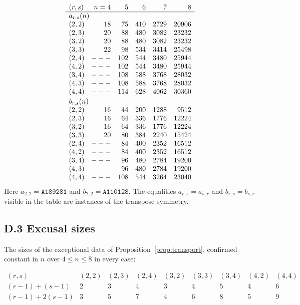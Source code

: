 \documentclass[11pt]{article}
\theoremstyle{definition}
\begin{document}
\[
\begin{array}{lrrrrr}
(r,s) & n=4 & 5 & 6 & 7 & 8\\\hline
\multicolumn{6}{l}{a_{r,s}(n)}\\
(2,2) & 18 & 75 & 410 & 2729 & 20906\\
(2,3) & 20 & 88 & 480 & 3082 & 23232\\
(3,2) & 20 & 88 & 480 & 3082 & 23232\\
(3,3) & 22 & 98 & 534 & 3414 & 25498\\
(2,4) & --- & 102 & 544 & 3480 & 25944\\
(4,2) & --- & 102 & 544 & 3480 & 25944\\
(3,4) & --- & 108 & 588 & 3768 & 28032\\
(4,3) & --- & 108 & 588 & 3768 & 28032\\
(4,4) & --- & 114 & 628 & 4062 & 30360\\[2pt]
\multicolumn{6}{l}{b_{r,s}(n)}\\
(2,2) & 16 & 44 & 200 & 1288 & 9512\\
(2,3) & 16 & 64 & 336 & 1776 & 12224\\
(3,2) & 16 & 64 & 336 & 1776 & 12224\\
(3,3) & 20 & 80 & 384 & 2240 & 15424\\
(2,4) & --- & 84 & 400 & 2352 & 16512\\
(4,2) & --- & 84 & 400 & 2352 & 16512\\
(3,4) & --- & 96 & 480 & 2784 & 19200\\
(4,3) & --- & 96 & 480 & 2784 & 19200\\
(4,4) & --- & 108 & 544 & 3264 & 23040
\end{array}
\]
Here $a_{2,2}=\texttt{A189281}$ and $b_{2,2}=\texttt{A110128}$. The equalities
$a_{r,s}=a_{s,r}$ and $b_{r,s}=b_{s,r}$ visible in the table are instances of
the transpose symmetry.

\subsection*{D.3 Excusal sizes}

The sizes of the exceptional data of Proposition~\ref{prop:transport},
confirmed constant in $n$ over $4\le n\le8$ in every case:

\[
\begin{array}{lcccccccc}
(r,s) & (2,2) & (2,3) & (2,4) & (3,2) & (3,3) & (3,4) & (4,2) & (4,4)\\\hline
(r-1)+(s-1) & 2 & 3 & 4 & 3 & 4 & 5 & 4 & 6\\
(r-1)+2(s-1) & 3 & 5 & 7 & 4 & 6 & 8 & 5 & 9
\end{array}
\]
\end{document}
